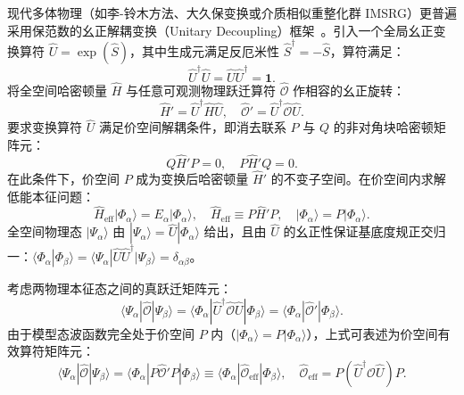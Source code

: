 现代多体物理（如李-铃木方法、大久保变换或介质相似重整化群 IMSRG）更普遍采用保范数的幺正解耦变换（Unitary Decoupling）框架~\cite{book-suhonen-from-nucleons-to-nucleus}。引入一个全局幺正变换算符 $\hat{U} = \exp(\hat{S})$，其中生成元满足反厄米性 $\hat{S}^\dagger = -\hat{S}$，算符满足：
\begin{equation}\label{eq:2-7-unitary-U}
\hat{U}^\dagger \hat{U} = \hat{U} \hat{U}^\dagger = \mathbf{1}.
\end{equation}
将全空间哈密顿量 $\hat{H}$ 与任意可观测物理跃迁算符 $\hat{\mathcal{O}}$ 作相容的幺正旋转：
\begin{equation}\label{eq:2-7-unitary-transform}
\hat{H}' = \hat{U}^\dagger \hat{H} \hat{U}, \quad \hat{\mathcal{O}}' = \hat{U}^\dagger \hat{\mathcal{O}} \hat{U}.
\end{equation}
要求变换算符 $\hat{U}$ 满足价空间解耦条件，即消去联系 $P$ 与 $Q$ 的非对角块哈密顿矩阵元：
\begin{equation}\label{eq:2-7-decoupling-condition}
Q \hat{H}' P = 0, \quad P \hat{H}' Q = 0.
\end{equation}
在此条件下，价空间 $P$ 成为变换后哈密顿量 $\hat{H}'$ 的不变子空间。在价空间内求解低能本征问题：
\begin{equation}\label{eq:2-7-Heff-model}
\hat{H}_{\mathrm{eff}} |\Phi_\alpha\rangle = E_\alpha |\Phi_\alpha\rangle, \quad \hat{H}_{\mathrm{eff}} \equiv P \hat{H}' P, \quad |\Phi_\alpha\rangle = P |\Phi_\alpha\rangle.
\end{equation}
全空间物理态 $|\Psi_\alpha\rangle$ 由 $|\Psi_\alpha\rangle = \hat{U} |\Phi_\alpha\rangle$ 给出，且由 $\hat{U}$ 的幺正性保证基底度规正交归一：$\langle \Phi_\alpha | \Phi_\beta \rangle = \langle \Psi_\alpha | \hat{U} \hat{U}^\dagger | \Psi_\beta \rangle = \delta_{\alpha\beta}$。

考虑两物理本征态之间的真跃迁矩阵元：
\begin{equation}\label{eq:2-7-true-matrix-element}
\langle \Psi_\alpha | \hat{\mathcal{O}} | \Psi_\beta \rangle = \langle \Phi_\alpha | \hat{U}^\dagger \hat{\mathcal{O}} \hat{U} | \Phi_\beta \rangle = \langle \Phi_\alpha | \hat{\mathcal{O}}' | \Phi_\beta \rangle.
\end{equation}
由于模型态波函数完全处于价空间 $P$ 内（$|\Phi_\alpha\rangle = P |\Phi_\alpha\rangle$），上式可表述为价空间有效算符矩阵元：
\begin{equation}\label{eq:2-7-Oeff-matrix-element}
\langle \Psi_\alpha | \hat{\mathcal{O}} | \Psi_\beta \rangle = \langle \Phi_\alpha | P \hat{\mathcal{O}}' P | \Phi_\beta \rangle \equiv \langle \Phi_\alpha | \hat{\mathcal{O}}_{\mathrm{eff}} | \Phi_\beta \rangle, \quad \hat{\mathcal{O}}_{\mathrm{eff}} = P \left( \hat{U}^\dagger \hat{\mathcal{O}} \hat{U} \right) P.
\end{equation}

